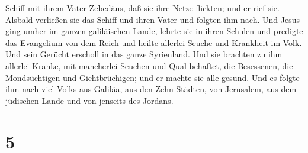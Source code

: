 Schiff mit ihrem Vater Zebedäus, daß sie ihre Netze flickten; und er
rief sie.  Alsbald verließen sie das Schiff und ihren Vater
und folgten ihm nach.  Und Jesus ging umher im ganzen
galiläischen Lande, lehrte sie in ihren Schulen und predigte das
Evangelium von dem Reich und heilte allerlei Seuche und Krankheit im
Volk.  Und sein Gerücht erscholl in das ganze Syrienland.
Und sie brachten zu ihm allerlei Kranke, mit mancherlei Seuchen und Qual
behaftet, die Besessenen, die Mondsüchtigen und Gichtbrüchigen; und er
machte sie alle gesund.  Und es folgte ihm nach viel Volks
aus Galiläa, aus den Zehn-Städten, von Jerusalem, aus dem jüdischen
Lande und von jenseits des Jordans.

\hypertarget{section-4}{%
\section{5}\label{section-4}}

